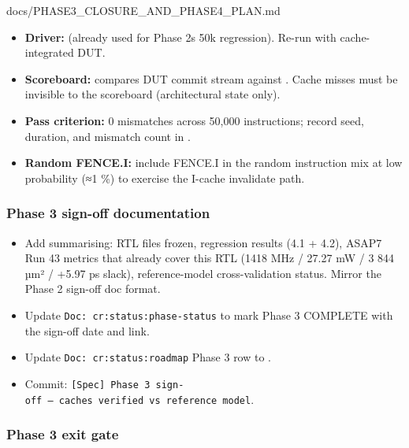 \begin{relocated}{docs/PHASE3_CLOSURE_AND_PHASE4_PLAN.md}
\begin{itemize}
\tightlist
\item
  \textbf{Driver:}  (already used
  for Phase 2\textquotesingle s 50k regression). Re-run with
  cache-integrated DUT.
\item
  \textbf{Scoreboard:}  compares DUT
  commit stream against . Cache misses must be
  invisible to the scoreboard (architectural state only).
\item
  \textbf{Pass criterion:} 0 mismatches across 50,000 instructions;
  record seed, duration, and mismatch count in
  .
\item
  \textbf{Random FENCE.I:} include FENCE.I in the random instruction mix
  at low probability (≈1 \%) to exercise the I-cache invalidate path.
\end{itemize}

\subsubsection{Phase 3 sign-off documentation}\label{ds:ch:phase3-closure-phase4-plan:43-phase-3-sign-off-documentation}

\begin{itemize}
\tightlist
\item
  Add  summarising: RTL files frozen,
  regression results (4.1 + 4.2), ASAP7 Run 43 metrics that already
  cover this RTL (1418 MHz / 27.27 mW / 3 844 µm² / +5.97 ps slack),
  reference-model cross-validation status. Mirror the Phase 2 sign-off
  doc format.
\item
  Update
  \texttt{Doc:\allowbreak{}\ cr:\allowbreak{}status:\allowbreak{}phase-\allowbreak{}status}
  to mark Phase 3 \ok{} COMPLETE with the sign-off date and link.
\item
  Update
  \texttt{Doc:\allowbreak{}\ cr:\allowbreak{}status:\allowbreak{}roadmap}
  Phase 3 row to \ok{}.
\item
  Commit:
  \texttt{[Spec]\ Phase\ 3\ sign-\allowbreak{}off\ —\ caches\ verified\ vs\ reference\ model}.
\end{itemize}

\subsubsection{Phase 3 exit gate}\label{ds:ch:phase3-closure-phase4-plan:44-phase-3-exit-gate}


\end{relocated}
